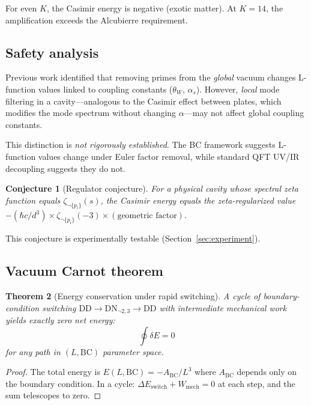 \documentclass[aps,prd,twocolumn,superscriptaddress,nofootinbib]{revtex4-2}
\newtheorem{theorem}{Theorem}
\newtheorem{conjecture}[theorem]{Conjecture}
\begin{document}
For even $K$, the Casimir energy is negative (exotic matter).
At $K = 14$, the amplification exceeds the Alcubierre requirement.

\subsection{Safety analysis}

Previous work identified that removing primes from the \emph{global}
vacuum changes L-function values linked to coupling constants
($\theta_W$, $\alpha_s$).
However, \emph{local} mode filtering in a cavity---analogous to
the Casimir effect between plates, which modifies the mode spectrum
without changing $\alpha$---may not affect global coupling constants.

This distinction is \emph{not rigorously established}.
The BC framework suggests L-function values change under
Euler factor removal, while standard QFT UV/IR decoupling
suggests they do not.

\begin{conjecture}[Regulator conjecture]
For a physical cavity whose spectral zeta function equals
$\zeta_{\neg\{p_i\}}(s)$, the Casimir energy equals the
zeta-regularized value $-({\hbar c}/{d^3}) \times
\zeta_{\neg\{p_i\}}(-3) \times (\text{geometric factor})$.
\end{conjecture}

This conjecture is experimentally testable (Section~\ref{sec:experiment}).

\subsection{Vacuum Carnot theorem}

\begin{theorem}[Energy conservation under rapid switching]
A cycle of boundary-condition switching
$\mathrm{DD} \to \mathrm{DN}_{\neg 2,3} \to \mathrm{DD}$
with intermediate mechanical work yields exactly zero net energy:
\begin{equation}
  \oint \delta E = 0
\end{equation}
for any path in $(L, \text{BC})$ parameter space.
\end{theorem}

\begin{proof}
The total energy is $E(L, \text{BC}) = -A_{\text{BC}} / L^3$
where $A_{\text{BC}}$ depends only on the boundary condition.
In a cycle: $\Delta E_{\text{switch}} + W_{\text{mech}} = 0$ at
each step, and the sum telescopes to zero.
\end{proof}
\end{document}
